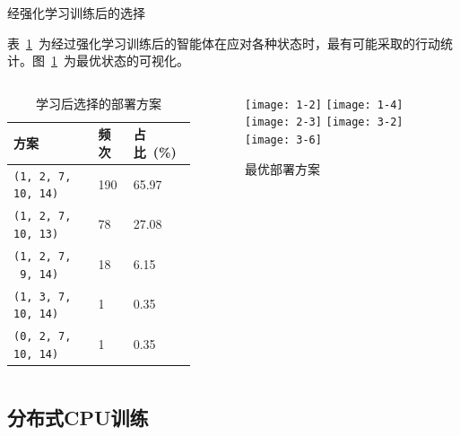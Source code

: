 \begin{frame}{经强化学习训练后的选择}
    \begin{block}

        表~\ref{tab:rlresult}~为经过强化学习训练后的智能体在应对各种状态时，最有可能采取的行动统计。图~\ref{fig:rlresult}~为最优状态的可视化。
    \end{block}
    \begin{columns}
        \begin{column}{0.5\textwidth}
            \begin{table}
                \centering
                \scriptsize
                \begin{tabularx}{\textwidth}{p{}p{}p{}}
                    \toprule
                    方案               & 频次  & 占比~(\%)  \\ \midrule
                \texttt{(1, 2, 7, 10, 14)} & 190 & 65.97 \\[0.2em]
                \texttt{(1, 2, 7, 10, 13)} & 78  & 27.08 \\[0.2em]
                \texttt{(1, 2, 7, ~9, 14)} & 18  & 6.15  \\[0.2em]
                \texttt{(1, 3, 7, 10, 14)} & 1   & 0.35  \\[0.2em]
                \texttt{(0, 2, 7, 10, 14)} & 1   & 0.35  \\ \bottomrule
                \end{tabularx}
                \caption{学习后选择的部署方案}
                \label{tab:rlresult}
            \end{table}
    \end{column}
    \begin{column}{0.5\textwidth}
            \begin{figure}
                \centering
                \texttt{[image: 1-2]}
                \texttt{[image: 1-4]}\\[0.3em]
                \texttt{[image: 2-3]}
                \texttt{[image: 3-2]}
                \texttt{[image: 3-6]}
                \caption{最优部署方案}
                \label{fig:rlresult}
            \end{figure}
        \end{column}
    \end{columns}
\end{frame}

\subsection{分布式CPU训练}

